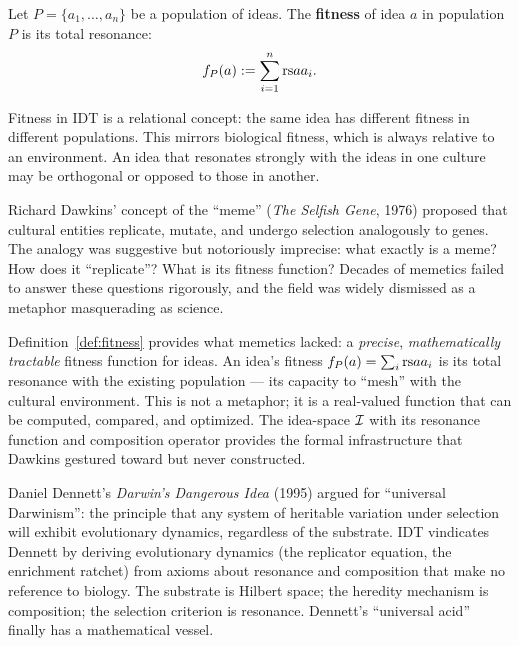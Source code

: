 \begin{definition}[Fitness]
\label{def:fitness}
Let $P = \{a_1, \ldots, a_n\}$ be a population of ideas.  The \textbf{fitness}
of idea $a$ in population $P$ is its total resonance:
\[
  f_P(a) := \sum_{i=1}^{n} \mathrm{rs}{a}{a_i}.
\]
\end{definition}

\begin{remark}
Fitness in IDT is a relational concept: the same idea has different fitness in
different populations.  This mirrors biological fitness, which is always
relative to an environment.  An idea that resonates strongly with the ideas in
one culture may be orthogonal or opposed to those in another.
\end{remark}

\begin{interpretation}
\label{interp:ch17:dawkins_formalized}
Richard Dawkins' concept of the ``meme'' (\textit{The Selfish Gene}, 1976)
proposed that cultural entities replicate, mutate, and undergo selection
analogously to genes.  The analogy was suggestive but notoriously imprecise:
what exactly is a meme?  How does it ``replicate''?  What is its fitness
function?  Decades of memetics failed to answer these questions rigorously,
and the field was widely dismissed as a metaphor masquerading as science.

Definition~\ref{def:fitness} provides what memetics lacked: a \emph{precise},
\emph{mathematically tractable} fitness function for ideas.  An idea's
fitness $f_P(a) = \sum_i \mathrm{rs}{a}{a_i}$ is its total resonance with the
existing population --- its capacity to ``mesh'' with the cultural
environment.  This is not a metaphor; it is a real-valued function that can
be computed, compared, and optimized.  The idea-space $\mathcal{I}$ with its
resonance function and composition operator provides the formal infrastructure
that Dawkins gestured toward but never constructed.

Daniel Dennett's \textit{Darwin's Dangerous Idea} (1995) argued for
``universal Darwinism'': the principle that any system of heritable variation
under selection will exhibit evolutionary dynamics, regardless of the
substrate.  IDT vindicates Dennett by deriving evolutionary dynamics
(the replicator equation, the enrichment ratchet) from axioms about
resonance and composition that make no reference to biology.  The substrate
is Hilbert space; the heredity mechanism is composition; the selection
criterion is resonance.  Dennett's ``universal acid'' finally has a
mathematical vessel.
\end{interpretation}


